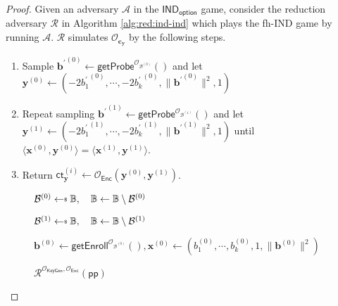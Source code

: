 \begin{proof}

Given an adversary $\mathcal{A}$ in the $\textsf{IND}_{\textsf{option}}$ game, consider the reduction adversary $\mathcal{R}$ in Algorithm \ref{alg:red:ind-ind} which plays the \textsf{fh-IND} game by running $\mathcal{A}$. $\mathcal{R}$ simulates $\mathcal{O}_{\mathbf{c_y}}$ by the following steps.

\begin{enumerate}

	\item Sample ${\mathbf{b}^\prime}^{(0)} \gets \textsf{getProbe}^{\mathcal{O}_{\mathcal{B}^{(0)}}}()$ and let $\mathbf{y}^{(0)} \gets (-2{b_1^\prime}^{(0)}, \cdots, -2{b_k^\prime}^{(0)}, \| {\mathbf{b}^\prime}^{(0)} \|^2, 1) $

	\item Repeat sampling ${\mathbf{b}^\prime}^{(1)} \gets \textsf{getProbe}^{\mathcal{O}_{\mathcal{B}^{(1)}}}()$ and let $\mathbf{y}^{(1)} \gets (-2{b_1^\prime}^{(1)}, \cdots, -2{b_k^\prime}^{(1)}, \| {\mathbf{b}^\prime}^{(1)} \|^2, 1)$ until $\langle \mathbf{x}^{(0)}, {\mathbf{y}^{(0)}} \rangle = \langle \mathbf{x}^{(1)}, {\mathbf{y}^{(1)}} \rangle$.
	
	\item Return $\textsf{ct}_{\mathbf{y}}^{(i)} \gets \mathcal{O}_{\textsf{Enc}}(\mathbf{y}^{(0)}, \mathbf{y}^{(1)})$.

\end{enumerate}

\begin{figure}[h]
\centering
	
	\begin{minipage}[t]{0.75\linewidth}
	\centering
	\begin{algorithm}[H]
	\caption{$\mathcal{R}^{\mathcal{O}_{\textsf{KeyGen}}, \mathcal{O}_{\textsf{Enc}}}(\textsf{pp})$}
	\label{alg:red:ind-ind}
	\begin{algorithmic}[1]
		\State $\mathcal{B}^{(0)} \getsdollar \mathbb{B}, \quad \mathbb{B} \gets \mathbb{B} \setminus \mathcal{B}^{(0)}$ \label{alg:red:ind-ind:B0}
		
		\State $\mathcal{B}^{(1)} \getsdollar \mathbb{B}, \quad \mathbb{B} \gets \mathbb{B} \setminus \mathcal{B}^{(1)}$ \label{alg:red:ind-ind:B1}

		\State $\mathbf{b}^{(0)} \gets \textsf{getEnroll}^{\mathcal{O}_{\mathcal{B}^{(0)}}}(), \mathbf{x}^{(0)} \gets (b_1^{(0)}, \cdots, b_k^{(0)}, 1, \|\mathbf{b}^{(0)}\|^2)$
		

\end{algorithmic}
\end{algorithm}
\end{minipage}
\end{figure}
\end{proof}
